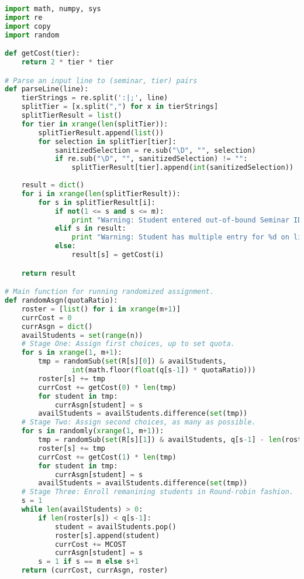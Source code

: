 \documentclass{article} %
\begin{document}
\begin{lstlisting}[language=python]
import math, numpy, sys
import re
import copy
import random

def getCost(tier):
    return 2 * tier * tier

# Parse an input line to (seminar, tier) pairs
def parseLine(line):
    tierStrings = re.split(':|;', line)
    splitTier = [x.split(",") for x in tierStrings]
    splitTierResult = list()
    for tier in xrange(len(splitTier)):
        splitTierResult.append(list())
        for selection in splitTier[tier]:
            sanitizedSelection = re.sub("\D", "", selection)
            if re.sub("\D", "", sanitizedSelection) != "":
                splitTierResult[tier].append(int(sanitizedSelection))
    
    result = dict()
    for i in xrange(len(splitTierResult)):
        for s in splitTierResult[i]:
            if not(1 <= s and s <= m):
                print "Warning: Student entered out-of-bound Seminar ID: %s" % line
            elif s in result:
                print "Warning: Student has multiple entry for %d on line %s" % (s, line)
            else:
                result[s] = getCost(i)

    return result

# Main function for running randomized assignment.
def randomAsgn(quotaRatio):
    roster = [list() for i in xrange(m+1)]
    currCost = 0
    currAsgn = dict()
    availStudents = set(range(n))
    # Stage One: Assign first choices, up to set quota.
    for s in xrange(1, m+1):
        tmp = randomSub(set(R[s][0]) & availStudents,
                int(math.floor(float(q[s-1]) * quotaRatio)))
        roster[s] += tmp
        currCost += getCost(0) * len(tmp)
        for student in tmp:
            currAsgn[student] = s
        availStudents = availStudents.difference(set(tmp))
    # Stage Two: Assign second choices, as many as possible.
    for s in randomly(xrange(1, m+1)):
        tmp = randomSub(set(R[s][1]) & availStudents, q[s-1] - len(roster[s]))
        roster[s] += tmp
        currCost += getCost(1) * len(tmp)
        for student in tmp:
            currAsgn[student] = s
        availStudents = availStudents.difference(set(tmp))
    # Stage Three: Enroll remanining students in Round-robin fashion.
    s = 1
    while len(availStudents) > 0:
        if len(roster[s]) < q[s-1]:
            student = availStudents.pop()
            roster[s].append(student)
            currCost += MCOST
            currAsgn[student] = s
        s = 1 if s == m else s+1    
    return (currCost, currAsgn, roster)


\end{lstlisting}
\end{document}
